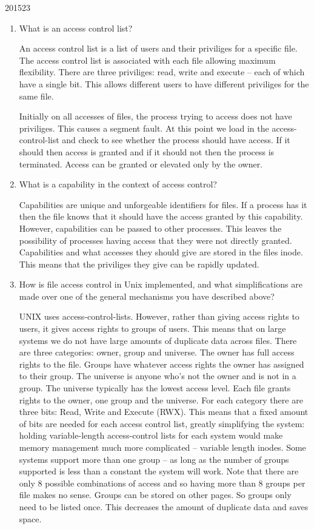\documentclass[10pt,\jkfside,a4paper]{article}
\begin{document}
\begin{examquestion}{2015}{2}{3}

\begin{enumerate}

\item What is an access control list?

An access control list is a list of users and their priviliges for a specific file.
The access control list is associated with each file allowing maximum flexibility. 
There are three priviliges:
read, write and execute -- each of which have a single bit. This allows different users to 
have different priviliges for the same file.

Initially on all accesses of files, the process trying to access does not have priviliges. 
This causes a segment fault. 
At this point we load in the access-control-list and check to see whether the process should 
have access. If it should then 
access is granted and if it should not then the process is terminated. Access can be granted 
or elevated only by the owner.

\item What is a capability in the context of access control?

Capabilities are unique and unforgeable identifiers for files. If a process has it then the 
file knows 
that it should have the access granted by this capability. However, capabilities can be 
passed to other processes. This leaves the possibility of processes having access that 
they were not directly granted. Capabilities and what accesses they should give are stored 
in the files 
inode. This means that the priviliges they give can be rapidly updated.

\item How is file access control in Unix implemented, and what simplifications are
made over one of the general mechanisms you have described above?

UNIX uses access-control-lists. However, rather than giving access rights to users, it gives 
access rights to groups of users. This means that on large systems we do not have large amounts 
of duplicate data across files. There are three categories: owner, group and universe. 
The owner has full access rights to the file. Groups have whatever access rights the owner 
has assigned to their group. The universe is anyone who's not the owner and is not in a group. 
The universe typically has the lowest access level. Each file grants rights to the owner, one 
group and the universe. For each category there are three bits: Read, Write and Execute (RWX). 
This means that a fixed amount of bits are needed for each access control list, greatly simplifying 
the system: holding variable-length access-control lists for each system would make memory management 
much more complicated -- variable length inodes. Some systems support more than one group -- as long 
as the number of groups supported is less than a constant the system will work. Note that there are 
only 8 possible combinations of access and so having more than 8 groups per file makes no sense. 
Groups can be stored on other pages. So groups only need to be listed once. This decreases 
the amount of duplicate data and saves space.


\end{enumerate}
\end{examquestion}
\end{document}
